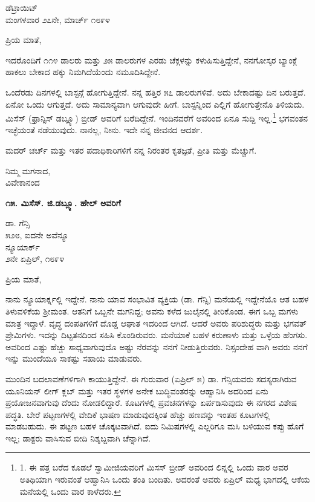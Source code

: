 \begin{flushright}
ಡೆಟ್ರಾಯಿಟ್\\ಮಂಗಳವಾರ ೨೭ನೇ, ಮಾರ್ಚ್ ೧೮೯೪
\end{flushright}

ಪ್ರಿಯ ಮಾತೆ,

ಇದರೊಂದಿಗೆ ೧೧೪ ಡಾಲರು ಮತ್ತು ೨೫ ಡಾಲರುಗಳ ಎರಡು ಚೆಕ್ಗಳನ್ನು ಕಳುಹಿಸುತ್ತಿದ್ದೇನೆ, ನನಗೋಸ್ಕರ ಬ್ಯಾಂಕ್ಗೆ ಹಾಕಲು ಬೇಕಾದ ಹಕ್ಕು ನಿಮಗಿದೆಯೆಂದು ನಮೂದಿಸಿದ್ದೇನೆ.

ಒಂದೆರಡು ದಿನಗಳಲ್ಲಿ ಬಾಸ್ಟನ್ಗೆ ಹೋಗುತ್ತಿದ್ದೇನೆ. ನನ್ನ ಹತ್ತಿರ ೫೭ ಡಾಲರುಗಳಿವೆ. ಅದು ಬೇಕಾದಷ್ಟು ದಿನ ಬರುತ್ತದೆ. ಏನೋ ಒಂದು ಆಗುತ್ತದೆ. ಅದು ಸಾಮಾನ್ಯವಾಗಿ ಆಗುವುದೇ ಹೀಗೆ. ಬಾಸ್ಟನ್ನಿಂದ ಎಲ್ಲಿಗೆ ಹೋಗುತ್ತೇನೊ ತಿಳಿಯದು. ಮಿಸೆಸ್ (ಫ್ರಾನ್ಸಿಸ್ ಡಬ್ಲ್ಯೂ) ಬ್ರೀಡ್ ಅವರಿಗೆ ಬರೆದಿದ್ದೇನೆ. ಇಂದಿನವರೆಗೆ ಅವರಿಂದ ಏನೂ ಸುದ್ದಿ ಇಲ್ಲ.\footnote{1. ಈ ಪತ್ರ ಬರೆದ ಕೂಡಲೆ ಸ್ವಾಮೀಜಿಯವರಿಗೆ ಮಿಸಸ್ ಬ್ರೀಡ್ ಅವರಿಂದ ಲಿನ್ನಲ್ಲಿ ಒಂದು ವಾರ ಅವರ ಅತಿಥಿಯಾಗಿ ಇರುವಂತೆ ಆಹ್ವಾನಿಸಿ ಒಂದು ತಂತಿ ಬಂದಿತು. ಅದರಂತೆ ಅವರು ಏಪ್ರಿಲ್ ಮಧ್ಯ ಭಾಗದಲ್ಲಿ ಆಕೆಯ ಮನೆಯಲ್ಲಿ ಒಂದು ವಾರ ಕಾಳೆದರು.} ಭಗವಂತನ ಇಚ್ಛೆಯಂತೆ ನಡೆಯುವುದು. ನಾನಲ್ಲ, ನೀನು. ಇದೇ ನನ್ನ ಜೀವನದ ಆದರ್ಶ.

ಮದರ್ ಚರ್ಚ್ ಮತ್ತು ಇತರ ಪದಾಧಿಕಾರಿಗಳಿಗೆ ನನ್ನ ನಿರಂತರ ಕೃತಜ್ಞತೆ, ಪ್ರೀತಿ ಮತ್ತು ಮೆಚ್ಚುಗೆ.

\begin{flushright}
ನಿಮ್ಮ ಮಗನಾದ,\\ವಿವೇಕಾನಂದ
\end{flushright}

\begin{center}
\textbf{೧೫. ಮಿಸೆಸ್. ಜಿ.ಡಬ್ಲ್ಯೂ. ಹೇಲ್ ಅವರಿಗೆ}
\end{center}

\begin{flushright}
 ಡಾ. ಗೆನ್ಸಿ\\೫೨೮, ಐದನೇ ಅವೆನ್ಯೂ\\ನ್ಯೂಯಾರ್ಕ್\\೨ನೇ ಏಪ್ರಿಲ್, ೧೮೯೪
\end{flushright}

ಪ್ರಿಯ ಮಾತೆ,

ನಾನು ನ್ಯೂಯಾರ್ಕ್ನಲ್ಲಿ ಇದ್ದೇನೆ. ನಾನು ಯಾವ ಸಂಭಾವಿತ ವ್ಯಕ್ತಿಯ (ಡಾ. ಗೆನ್ಸಿ) ಮನೆಯಲ್ಲಿ ಇದ್ದೇನೆಯೊ ಆತ ಬಹಳ ತಿಳುವಳಿಕೆಯ ಶ‍್ರೀಮಂತ. ಆತನಿಗೆ ಒಬ್ಬನೇ ಮಗನಿದ್ದ; ಅವನು ಕಳೆದ ಜುಲೈನಲ್ಲಿ ತೀರಿಕೊಂಡ. ಈಗ ಒಬ್ಬ ಮಗಳು ಮಾತ್ರ ಇದ್ದಾಳೆ. ವೃದ್ಧ ದಂಪತಿಗಳಿಗೆ ದೊಡ್ಡ ಆಘಾತ ಇದರಿಂದ ಆಗಿದೆ. ಆದರೆ ಅವರು ಪರಿಶುದ್ಧರು ಮತ್ತು ಭಗವತ್ ಪ್ರೇಮಿಗಳು. ಇದನ್ನು ದಿಟ್ಟತನದಿಂದ ಸಹಿಸಿ ಕೊಂಡಿರುವರು. ಮನೆಯಾಕೆ ಬಹಳ ಕರುಣಾಳು ಮತ್ತು ಒಳ್ಳೆಯ ಹೆಂಗಸು. ಅವರಿಂದ ಎಷ್ಟು ಹೆಚ್ಚು ಸಾಧ್ಯವಾಗುವುದೊ ಅಷ್ಟು ನೆರವನ್ನು ನನಗೆ ನೀಡುತ್ತಿರುವರು. ನಿಸ್ಸಂದೇಹ ವಾಗಿ ಅವರು ನನಗೆ ಇನ್ನು ಮುಂದೆಯೂ ಸಾಕಷ್ಟು ಸಹಾಯ ಮಾಡುವರು.

ಮುಂದಿನ ಬದಲಾವಣೆಗಳಿಗಾಗಿ ಕಾಯುತ್ತಿದ್ದೇನೆ. ಈ ಗುರುವಾರ (ಏಪ್ರಿಲ್ ೫) ಡಾ. ಗೆನ್ಸಿಯವರು ಸದಸ್ಯರಾಗಿರುವ ಯೂನಿಯನ್ ಲೀಗ್ ಕ್ಲಬ್ ಮತ್ತು ಇತರ ಸ್ಥಳಗಳ ಅನೇಕ ಬುದ್ಧಿವಂತರನ್ನು ಆಹ್ವಾನಿಸಿ ಅದರಿಂದ ಏನು ಪ್ರಯೋಜನವಾಗುವು ದೆಂದು ನೋಡಲಿದ್ದಾರೆ. ಕೂಟಗಳಲ್ಲಿ ಪ್ರವಚನಗಳನ್ನು ಏರ್ಪಡಿಸುವುದು ಈ ನಗರದ ವಿಶೇಷ ಪದ್ಧತಿ. ಬೇರೆ ಪಟ್ಟಣಗಳಲ್ಲಿ ವೇದಿಕೆ ಭಾಷಣ ಮಾಡುವುದಕ್ಕಿಂತ ಹೆಚ್ಚು ಹಣವನ್ನು ಇಂತಹ ಕೂಟಗಳಲ್ಲಿ ಮಾಡಬಹುದು. ಈ ಪಟ್ಟಣ ಬಹಳ ಚೊಕ್ಕಟವಾಗಿದೆ. ಐದು ನಿಮಿಷಗಳಲ್ಲಿ ಎಲ್ಲರಿಗೂ ಮಸಿ ಬಳಿಯುವ ಕಪ್ಪು ಹೊಗೆ ಇಲ್ಲ; ಡಾಕ್ಟರು ವಾಸಿಸುವ ಬೀದಿ ನಿಶ್ಶಬ್ದವಾಗಿ ಚೆನ್ನಾಗಿದೆ.

